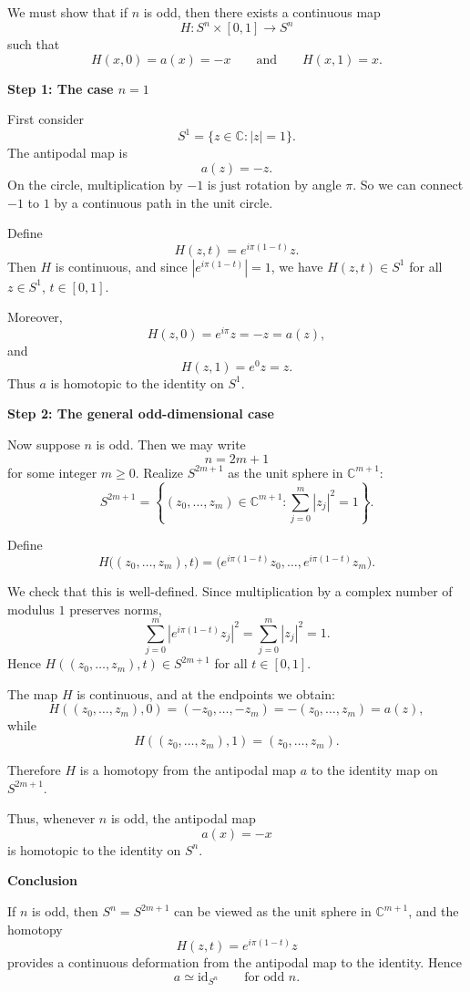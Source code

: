 \begin{solution}
We must show that if \(n\) is odd, then there exists a continuous map
\[
H:S^n\times [0,1]\to S^n
\]
such that
\[
H(x,0)=a(x)=-x
\qquad\text{and}\qquad
H(x,1)=x.
\]


\medskip
\noindent\textbf{Step 1: The case \(n=1\)}\par
\smallskip


First consider
\[
S^1=\{z\in \mathbb C:|z|=1\}.
\]
The antipodal map is
\[
a(z)=-z.
\]
On the circle, multiplication by \(-1\) is just rotation by angle \(\pi\). So we can connect \(-1\) to \(1\) by a continuous path in the unit circle.

Define
\[
H(z,t)=e^{i\pi(1-t)}z.
\]
Then \(H\) is continuous, and since \(|e^{i\pi(1-t)}|=1\), we have \(H(z,t)\in S^1\) for all \(z\in S^1\), \(t\in[0,1]\).

Moreover,
\[
H(z,0)=e^{i\pi}z=-z=a(z),
\]
and
\[
H(z,1)=e^0 z=z.
\]
Thus \(a\) is homotopic to the identity on \(S^1\).


\medskip
\noindent\textbf{Step 2: The general odd-dimensional case}\par
\smallskip


Now suppose \(n\) is odd. Then we may write
\[
n=2m+1
\]
for some integer \(m\ge 0\). Realize \(S^{2m+1}\) as the unit sphere in \(\mathbb C^{m+1}\):
\[
S^{2m+1}
=
\left\{
(z_0,\dots,z_m)\in \mathbb C^{m+1}
:
\sum_{j=0}^m |z_j|^2=1
\right\}.
\]

Define
\[
H\big((z_0,\dots,z_m),t\big)
=
\big(e^{i\pi(1-t)}z_0,\dots,e^{i\pi(1-t)}z_m\big).
\]

We check that this is well-defined. Since multiplication by a complex number of modulus \(1\) preserves norms,
\[
\sum_{j=0}^m \left|e^{i\pi(1-t)}z_j\right|^2
=
\sum_{j=0}^m |z_j|^2
=
1.
\]
Hence \(H((z_0,\dots,z_m),t)\in S^{2m+1}\) for all \(t\in[0,1]\).

The map \(H\) is continuous, and at the endpoints we obtain:
\[
H((z_0,\dots,z_m),0)
=
(-z_0,\dots,-z_m)
=
-(z_0,\dots,z_m)
=
a(z),
\]
while
\[
H((z_0,\dots,z_m),1)
=
(z_0,\dots,z_m).
\]

Therefore \(H\) is a homotopy from the antipodal map \(a\) to the identity map on \(S^{2m+1}\).

Thus, whenever \(n\) is odd, the antipodal map
\[
a(x)=-x
\]
is homotopic to the identity on \(S^n\).


\medskip
\noindent\textbf{Conclusion}\par
\smallskip


If \(n\) is odd, then \(S^n=S^{2m+1}\) can be viewed as the unit sphere in \(\mathbb C^{m+1}\), and the homotopy
\[
H(z,t)=e^{i\pi(1-t)}z
\]
provides a continuous deformation from the antipodal map to the identity. Hence
\[
a\simeq \mathrm{id}_{S^n}
\qquad\text{for odd }n.
\]



\end{solution}
